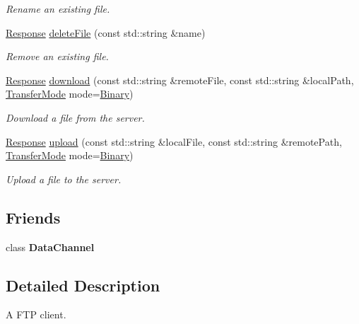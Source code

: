 \begin{DoxyCompactItemize}
\begin{DoxyCompactList}\small\item\em Rename an existing file. \end{DoxyCompactList}\item 
\hyperlink{classsf_1_1_ftp_1_1_response}{Response} \hyperlink{classsf_1_1_ftp_a8aa272b0eb7769a850006e70fcad370f}{delete\+File} (const std\+::string \&name)
\begin{DoxyCompactList}\small\item\em Remove an existing file. \end{DoxyCompactList}\item 
\hyperlink{classsf_1_1_ftp_1_1_response}{Response} \hyperlink{classsf_1_1_ftp_a20c1600ec5fd6f5a2ad1429ab8aa5df4}{download} (const std\+::string \&remote\+File, const std\+::string \&local\+Path, \hyperlink{classsf_1_1_ftp_a1cd6b89ad23253f6d97e6d4ca4d558cb}{Transfer\+Mode} mode=\hyperlink{classsf_1_1_ftp_a1cd6b89ad23253f6d97e6d4ca4d558cba6f253b362639fb5e059dc292762a21ee}{Binary})
\begin{DoxyCompactList}\small\item\em Download a file from the server. \end{DoxyCompactList}\item 
\hyperlink{classsf_1_1_ftp_1_1_response}{Response} \hyperlink{classsf_1_1_ftp_a46d6e15cddd719288b5a08b685e11765}{upload} (const std\+::string \&local\+File, const std\+::string \&remote\+Path, \hyperlink{classsf_1_1_ftp_a1cd6b89ad23253f6d97e6d4ca4d558cb}{Transfer\+Mode} mode=\hyperlink{classsf_1_1_ftp_a1cd6b89ad23253f6d97e6d4ca4d558cba6f253b362639fb5e059dc292762a21ee}{Binary})
\begin{DoxyCompactList}\small\item\em Upload a file to the server. \end{DoxyCompactList}\end{DoxyCompactItemize}
\subsection*{Friends}
\begin{DoxyCompactItemize}
\item 
\hypertarget{classsf_1_1_ftp_a8dee57337b6a7e183bfe21d178757b0c}{class {\bfseries Data\+Channel}}\label{classsf_1_1_ftp_a8dee57337b6a7e183bfe21d178757b0c}

\end{DoxyCompactItemize}


\subsection{Detailed Description}
A F\+T\+P client. 

